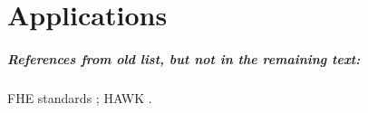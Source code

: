 \chapter{Applications}
\label{chap:apps}




\paragraph{References from old list, but not in the remaining text:}
FHE standards \cite{2017:applications-of-homomorphic-encryption};
HAWK \cite{2016:SP:Hawk}.


